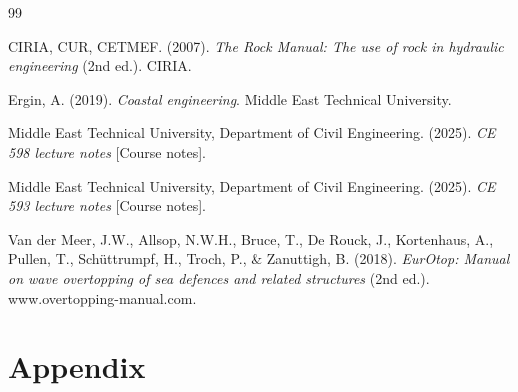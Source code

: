 \documentclass[a4paper, 11pt]{article}
\begin{document}
\begin{thebibliography}{99}

CIRIA, CUR, CETMEF. (2007). \textit{The Rock Manual: The use of rock in hydraulic engineering} (2nd ed.). CIRIA.

\bibitem{}
Ergin, A. (2019). \textit{Coastal engineering}. Middle East 
Technical University.

Middle East Technical University, Department of Civil Engineering. (2025). \textit{CE 598 lecture notes} [Course notes].

Middle East Technical University, Department of Civil Engineering. (2025). \textit{CE 593 lecture notes} [Course notes].

Van der Meer, J.W., Allsop, N.W.H., Bruce, T., De Rouck, J., Kortenhaus, A., Pullen, T., Sch\"{u}ttrumpf, H., Troch, P., \& Zanuttigh, B. (2018). \textit{EurOtop: Manual on wave overtopping of sea defences and related structures} (2nd ed.). www.overtopping-manual.com.

\end{thebibliography}
\newpage

\appendix
\section{Appendix}
\end{document}
